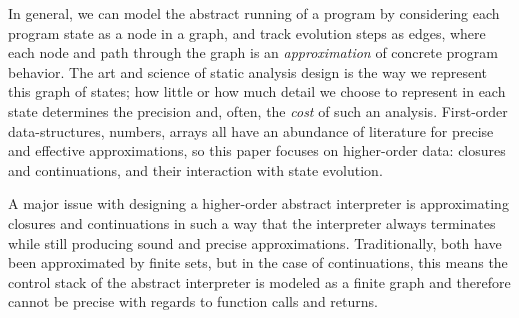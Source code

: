 
In general, we can model the abstract running of a program by
considering each program state as a node in a graph, and track
evolution steps as edges, where each node and path through the graph
is an \emph{approximation} of concrete program behavior.
%
The art and science of static analysis design is the way we represent this graph of states; how little or how much detail we choose to represent in each state determines the precision and, often, the \emph{cost} of such an analysis.
%
First-order data-structures, numbers, arrays all have an abundance of
literature for precise and effective approximations, so this paper
focuses on higher-order data: closures and continuations, and their
interaction with state evolution.

A major issue with designing a higher-order abstract interpreter is
approximating closures and continuations in such a way that the
interpreter always terminates while still producing sound and precise
approximations.  Traditionally, both have been approximated by finite
sets, but in the case of continuations, this means the control stack
of the abstract interpreter is modeled as a finite graph and
therefore cannot be precise with regards to function calls and
returns.


